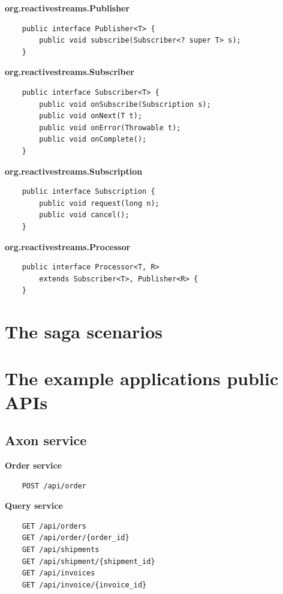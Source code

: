 \documentclass[oneside,
  digital, %
  table,   %
  nolof,     %
  nolot,     %
]{fithesis3}
\begin{document}
\noindent
\textbf{org.reactivestreams.Publisher}

\begin{verbatim}
    public interface Publisher<T> {
        public void subscribe(Subscriber<? super T> s);
    }
\end{verbatim}

\noindent
\textbf{org.reactivestreams.Subscriber}

\begin{verbatim}
    public interface Subscriber<T> {
        public void onSubscribe(Subscription s);
        public void onNext(T t);
        public void onError(Throwable t);
        public void onComplete();
    }
\end{verbatim}

\noindent
\textbf{org.reactivestreams.Subscription}

\begin{verbatim}
    public interface Subscription {
        public void request(long n);
        public void cancel();
    }
\end{verbatim}

\noindent
\textbf{org.reactivestreams.Processor}

\begin{verbatim}
    public interface Processor<T, R> 
        extends Subscriber<T>, Publisher<R> {
    }
\end{verbatim}


\chapter{The saga scenarios}
\label{sec:appendix-scenarios}

\chapter{The example applications public APIs}
\label{sec:appendixAPI}

\section{Axon service}

\textbf{Order service}

\begin{verbatim}
    POST /api/order
\end{verbatim}

\noindent
\textbf{Query service}

\begin{verbatim}
    GET /api/orders
    GET /api/order/{order_id}
    GET /api/shipments
    GET /api/shipment/{shipment_id}
    GET /api/invoices
    GET /api/invoice/{invoice_id}
\end{verbatim}
\end{document}
